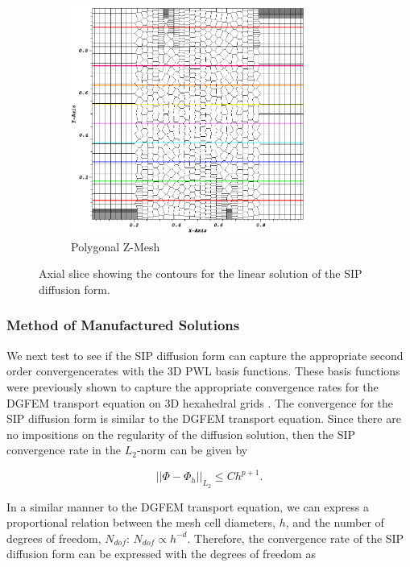 \begin{figure}
\begin{subfigure}[b]{0.45\textwidth}
		\includegraphics[width=0.85\textwidth]{figures/sec_DSA/SIP_z_poly_lin_contour.png}
		\caption{Polygonal Z-Mesh}
	\end{subfigure}
\caption{Axial slice showing the contours for the linear solution of the SIP diffusion form.}
\label{fig::SIP_linear_sol}
\end{figure}

\subsubsection{Method of Manufactured Solutions}
\label{sec::DSA_Results_SIP_MMS}

We next test to see if the SIP diffusion form can capture the appropriate second order convergencerates with the 3D PWL basis functions. These basis functions were previously shown to capture the appropriate convergence rates for the DGFEM transport equation on 3D hexahedral grids \cite{bailey2008phd}. The convergence for the SIP diffusion form is similar to the DGFEM transport equation. Since there are no impositions on the regularity of the diffusion solution, then the SIP convergence rate in the $L_2$-norm can be given by

\begin{equation}
\label{eq::SIP_convergence_h}
|| \Phi - \Phi_h ||_{L_2} \leq C h^{p+1}.
\end{equation}

\noindent In a similar manner to the DGFEM transport equation, we can express a proportional relation between the mesh cell diameters, $h$, and the number of degrees of freedom, $N_{dof}$: $N_{dof} \propto h^{-d}$. Therefore, the convergence rate of the SIP diffusion form can be expressed with the degrees of freedom as 

